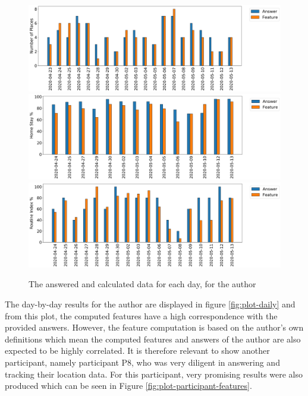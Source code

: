 \begin{figure}
    \centering
    \includegraphics[width=\textwidth]{images/study/places_d6b2d9b9-398b-4e0d-b52b-224747f515c8.png}
    \includegraphics[width=\textwidth]{images/study/homestay_d6b2d9b9-398b-4e0d-b52b-224747f515c8.png}
    \includegraphics[width=\textwidth]{images/study/routine_d6b2d9b9-398b-4e0d-b52b-224747f515c8.png}
    \caption{The answered and calculated data for each day, for the author}
    \label{fig:plot-author-features}
\end{figure}

The day-by-day results for the author are displayed in figure \ref{fig:plot-daily} and from this plot, the computed features have a high correspondence with the provided answers. However, the feature computation is based on the author's own definitions which mean the computed features and answers of the author are also expected to be highly correlated. It is therefore relevant to show another participant, namely participant P8, who was very diligent in answering and tracking their location data. For this participant, very promising results were also produced which can be seen in Figure \ref{fig:plot-participant-features}.


